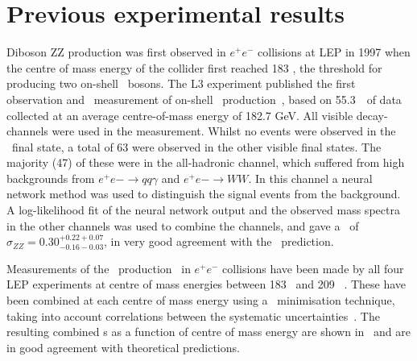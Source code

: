
%
\section{Previous experimental results}

Diboson ZZ production was first observed in $e^+e^-$ collisions at LEP in 1997
when the centre of mass energy of the collider first reached 183 \gev, the
threshold for producing two on-shell \Z\ bosons.
The L3 experiment published the first observation and \cx\ measurement
of on-shell \ZZ\ production~\cite{Acciarri1999281}, based on 55.3~\ipb\
of data collected at an average centre-of-mass energy of 182.7 GeV. All visible
decay-channels were used in the measurement. Whilst no events were
observed in the \llll\ final state, a total of 63 were observed in
the other visible final states. The majority (47) of these were in the
all-hadronic channel, which suffered from high backgrounds from $e^+e-
\rightarrow qq \gamma$ and $e^+e- \rightarrow WW$. In this channel a neural
network method was used to distinguish the signal events from the background. A
log-likelihood fit of the neural network output and the observed mass spectra in
the other channels was used to combine the channels, and gave a \cx\ of
$\sigma_{ZZ} = 0.30^{+0.22 +0.07}_{-0.16 -0.03}$, in very good agreement with
the \sm\ prediction. 

Measurements of the \ZZ\ production \cx\ in $e^+e^-$ collisions have
been made by all four LEP experiments at centre of mass energies between 183
\gev\ and 209
\gev~\cite{Abbiendi:2003va,Abdallah:2003dv,Acciarri:1999ug,Schael:1166743}.
These have been combined at each centre of mass energy using a \chisquared\
minimisation technique, taking into account correlations between the systematic
uncertainties~\cite{bib:LEPEW2006}. The resulting combined \cx s as a
function of centre of mass energy are shown in~\fig{lep-cx} and are in good agreement with
theoretical predictions.


